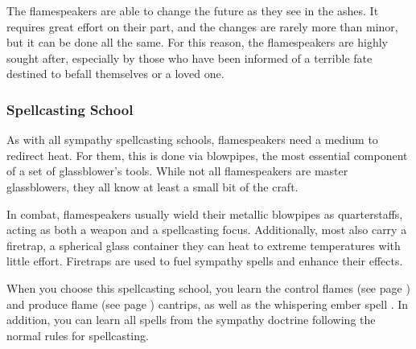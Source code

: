         The flamespeakers are able to change the future as they see in the ashes.
        It requires great effort on their part, and the changes are rarely more than minor, but it can be done all the same.
        For this reason, the flamespeakers are highly sought after, especially by those who have been informed of a terrible fate destined to befall themselves or a loved one.

    \subsubsection{Spellcasting School}
        As with all sympathy spellcasting schools, flamespeakers need a medium to redirect heat.
        For them, this is done via blowpipes, the most essential component of a set of glassblower's tools.
        While not all flamespeakers are master glassblowers, they all know at least a small bit of the craft.

        In combat, flamespeakers usually wield their metallic blowpipes as quarterstaffs, acting as both a weapon and a spellcasting focus.
        Additionally, most also carry a firetrap, a spherical glass container they can heat to extreme temperatures with little effort. %
        Firetraps are used to fuel sympathy spells and enhance their effects.

        When you choose this spellcasting school, you learn the control flames (see page \pageref{spell::controlflames}) and produce flame (see page \pageref{spell::produceflame}) cantrips, as well as the whispering ember spell \pageref{spell::whisperingember}.
        In addition, you can learn all spells from the sympathy doctrine following the normal rules for spellcasting.

